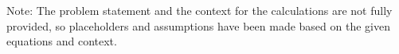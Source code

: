\documentclass[answers,a4paper,12pt]{exam}
\begin{document}
\begin{questions}


Note: The problem statement and the context for the calculations are not fully provided, so placeholders and assumptions have been made based on the given equations and context.
\end{questions}
\end{document}
